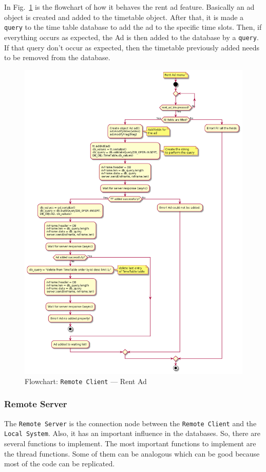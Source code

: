 In Fig.~\ref{fig:flow-rc-rent-ad} is the flowchart of how it behaves the rent ad feature.
Basically an ad object is created and added to the timetable object. After that, it is made a \texttt{query} to the time table database to add the ad to the specific time slots. Then, if everything occurs as expected, the Ad is then added to the database by a \texttt{query}. If that query don't occur as expected, then the timetable previously added needs to be removed from the database.
%
\begin{figure}[htb!]
\centering
    \includegraphics[width=0.8\columnwidth]{./img/flow-rc-rent-ad.png}
  \caption{Flowchart: \texttt{Remote Client} --- Rent Ad}%
\label{fig:flow-rc-rent-ad}
\end{figure}

\subsubsection{Remote Server}
\label{sec:rs-flowcharts}
%
The \texttt{Remote Server} is the connection node between the \texttt{Remote Client} and the \texttt{Local System}. Also, it has an important influence in the databases. So, there are several functions to implement.
The most important functions to implement are the thread functions. Some of them can be analogous which can be good because most of the code can be replicated.

